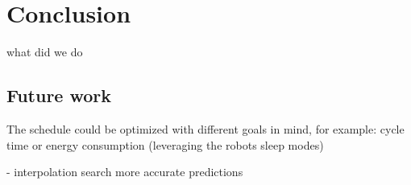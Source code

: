 \chapter{Conclusion}
\label{ch:conclusion}
\graphicspath{{chapters/Conclusion/}}

what did we do

\section{Future work}

The schedule could be optimized with different goals in mind, for example: cycle time or energy consumption (leveraging the robots sleep modes)

\cite{EnergyOptimisationBukata}

- interpolation search more accurate predictions
